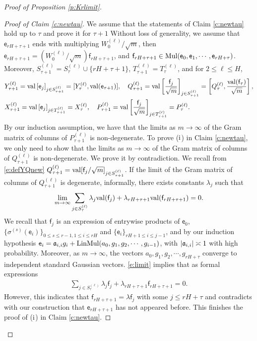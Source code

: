 \documentclass{article}
\numberwithin{equation}{section}
\newcommand{\fa}{{\frak a}}
\newcommand{\sfe}{{\mathsf e}}
\newcommand{\sff}{{\mathsf f}}
\newcommand{\la}{\lambda}
\renewcommand{\leq}{\leqslant}
\newcommand{\1}{\mathds{1}}
\theoremstyle{plain} %
\newcommand{\val}{{\rm val}}
\newcommand{\LinMul}{{\rm LinMul}}
\newcommand{\Mul}{{\rm Mul}}
\begin{document}
\begin{proof}[Proof of Proposition \ref{p:Krlimit}]
\begin{proof}[Proof of Claim \ref{c:newtau}]
We assume that the statements of Claim \ref{c:newtau} hold up to $\tau$ and prove it for $\tau+1$
Without loss of generality, we assume that $\sfe_{rH+\tau+1}$ ends with multiplying $W_0^{(\ell)}/\sqrt m$, then 
$\sfe_{rH+\tau+1}=(W_0^{(\ell)}/\sqrt m)\sff_{rH+\tau+1}$, and $\sff_{rH+\tau+1}\in \Mul(\sfe_0, \sfe_1,\cdots, \sfe_{rH+\tau})$. 
%
Moreover,
$S^{(\ell)}_{\tau+1}=S^{(\ell)}_{\tau}\cup\{rH+\tau+1\}$, $T^{(\ell)}_{\tau+1}=T^{(\ell)}_\tau
$, and for $2\leq \ell \leq H$,
%
\begin{align}\begin{split}\label{e:defYQnew}
&Y_{\tau+1}^{(\ell)}=\val\left[\sfe_j\right]_{j\in S^{(\ell)}_{\tau+1}}=[Y_\tau^{(\ell)}, \val(\sfe_{\tau+1})],\quad Q_{\tau+1}^{(\ell)}=\val \left[\frac{\sff_j}{\sqrt m}\right]_{j\in S^{(\ell)}_{\tau+1}}=\left[Q_\tau^{(\ell)}, \frac{\val(\sff_{\tau})}{\sqrt m}\right],\\
&X_{\tau+1}^{(\ell)}=
\val \left[\sfe_j\right]_{j\in T^{(\ell)}_{\tau+1}}=X_\tau^{(\ell)},\quad P_{\tau+1}^{(\ell)}=\val\left[\frac{\sff_j}{\sqrt m}\right]_{j\in T^{(\ell)}_{\tau+1}}=P_\tau^{(\ell)}.
\end{split}\end{align}
By our induction assumption, we have that the limits as $m\rightarrow \infty$ of the Gram matrix of columns of $P_{\tau+1}^{(\ell)}$ is non-degenerate. To prove (${\rm i}$) in Claim \ref{c:newtau}, we only need to show that the limits as $m\rightarrow \infty$ of the Gram matrix of columns of $Q_{\tau+1}^{(\ell)}$ is non-degenerate. We prove it by contradiction. We recall from \eqref{e:defYQnew} $Q_{\tau+1}^{(\ell)}=\val[\sff_j/\sqrt m]_{j\in S_{\tau+1}^{(\ell)}}$. If the limit of the Gram matrix of columns of $Q_{\tau+1}^{(\ell)}$ is degenerate, informally, there exists constants $\la_j$ such that 
\begin{align}\label{e:limit}
\lim_{m\rightarrow \infty} \sum_{j\in S_\tau^{(\ell)}}\la_j \val(\sff_j)+\la_{rH+\tau+1}\val(\sff_{rH+\tau+1})=0.
\end{align} 
We recall that $\sff_j$ is an expression of entrywise products of $\sfe_0$, $\{\sigma^{(s)}(\sfe_i)\}_{0\leq s\leq r-1, 1\leq i\leq rH}$ and $\{\sfe_i\}_{rH+1\leq i\leq j-1}$, and by our induction hypothesis $\sfe_i=\fa_{i,i}g_{i}+\LinMul(a_0, g_1,g_2,\cdots, g_{i-1})$, with $|\fa_{i,i}|\asymp 1$ with high probability.
Moreover, as $m\rightarrow \infty$, the vectors $a_0, g_1, g_2, \cdots, g_{rH+\tau}$ converge to independent standard Gaussian vectors. \eqref{e:limit} implies that as formal expressions
\begin{align*}
\sum_{j\in S_\tau^{(\ell)}}\la_j \sff_j+\la_{rH+\tau+1}\sff_{rH+\tau+1}=0.
\end{align*}
However, this indicates that $\sff_{rH+\tau+1}= \la \sff_j$ with some $j\leq rH+\tau$ and   contradicts with our construction that $\sfe_{rH+\tau+1}$ has not appeared before.
This finishes the proof of (${\rm i}$) in Claim \ref{c:newtau}.






\end{proof}
\end{proof}
\end{document}
